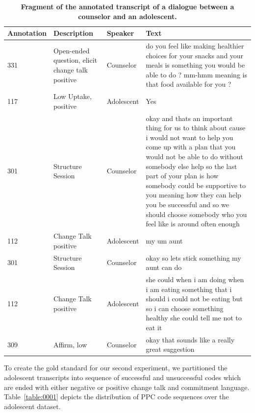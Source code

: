 \documentclass{amia}
\begin{document}
\begin{table}[htb]
\caption{\textbf{Fragment of the annotated transcript of a dialogue between a counselor and an adolescent.}}    
\label{table:06}
\centering
\begin{tabular}{lp{3.6cm}lp{8cm}}
\hline
\hline
Annotation  & Description & Speaker & Text \\
\hline
331 &	Open-ended question, elicit change talk positive &	Counselor &	do you feel like making healthier choices for your snacks and your meals is something you would be able to do ? mm-hmm meaning is that food available for you ? \\
117 &	Low Uptake, positive	& Adolescent &	Yes \\
301 &	Structure Session	& Counselor &	okay and thats an important thing for us to think about cause i would not want to help you come up with a plan that you would not be able to do without somebody else help so the last part of your plan is how somebody could be supportive to you meaning how they can help you be successful and so we should choose somebody who you feel like is around often enough \\
112 &	Change Talk positive	& Adolescent &	my um aunt \\
301 &	Structure Session	& Counselor &	okay so lets stick something my aunt can do \\
112 &	Change Talk positive &	Adolescent &	she could when i am doing when i am eating something that i should i could not be eating but so i can choose something healthy she could tell me not to eat it \\
309 &	Affirm, low &	Counselor &	okay that sounds like a really great suggestion \\
\hline
\hline
\end{tabular}
\end{table}

To create the gold standard for our second experiment, we partitioned the adolescent transcripts into sequence of successful and unsuccessful codes which are ended with either negative or positive change talk and commitment language. Table~\ref{table:0001} depicts the distribution of PPC code sequences over the adolescent dataset.
\end{document}
